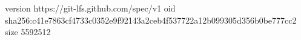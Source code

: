 version https://git-lfs.github.com/spec/v1
oid sha256:c41e7863cf4733c0352e9f92143a2ceb4f537722a12b099305d356b0be777cc2
size 5592512
